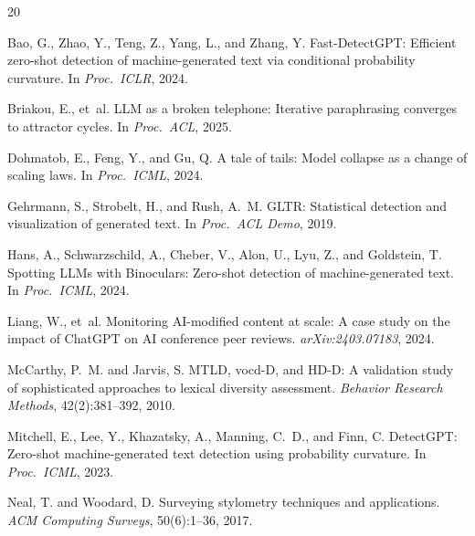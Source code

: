 \documentclass[11pt,twocolumn]{article}
\begin{document}
{\small

\begin{thebibliography}{20}

Bao, G., Zhao, Y., Teng, Z., Yang, L., and Zhang, Y.
\newblock Fast-DetectGPT: Efficient zero-shot detection of machine-generated text via conditional probability curvature.
\newblock In \emph{Proc.\ ICLR}, 2024.

Briakou, E., et~al.
\newblock LLM as a broken telephone: Iterative paraphrasing converges to attractor cycles.
\newblock In \emph{Proc.\ ACL}, 2025.

Dohmatob, E., Feng, Y., and Gu, Q.
\newblock A tale of tails: Model collapse as a change of scaling laws.
\newblock In \emph{Proc.\ ICML}, 2024.

Gehrmann, S., Strobelt, H., and Rush, A.~M.
\newblock GLTR: Statistical detection and visualization of generated text.
\newblock In \emph{Proc.\ ACL Demo}, 2019.

Hans, A., Schwarzschild, A., Cheber, V., Alon, U., Lyu, Z., and Goldstein, T.
\newblock Spotting LLMs with Binoculars: Zero-shot detection of machine-generated text.
\newblock In \emph{Proc.\ ICML}, 2024.

Liang, W., et~al.
\newblock Monitoring AI-modified content at scale: A case study on the impact of ChatGPT on AI conference peer reviews.
\newblock \emph{arXiv:2403.07183}, 2024.

McCarthy, P.~M. and Jarvis, S.
\newblock MTLD, vocd-D, and HD-D: A validation study of sophisticated approaches to lexical diversity assessment.
\newblock \emph{Behavior Research Methods}, 42(2):381--392, 2010.

Mitchell, E., Lee, Y., Khazatsky, A., Manning, C.~D., and Finn, C.
\newblock DetectGPT: Zero-shot machine-generated text detection using probability curvature.
\newblock In \emph{Proc.\ ICML}, 2023.

Neal, T. and Woodard, D.
\newblock Surveying stylometry techniques and applications.
\newblock \emph{ACM Computing Surveys}, 50(6):1--36, 2017.


\end{thebibliography}}
\end{document}
